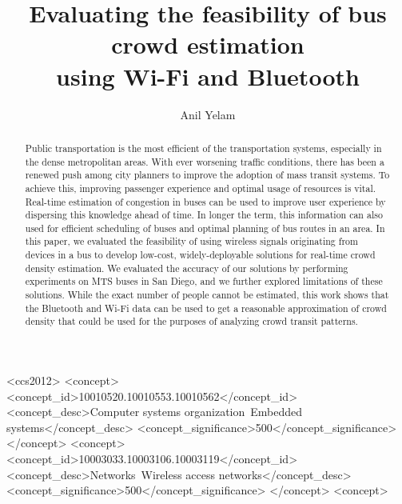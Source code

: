\documentclass[sigconf,nonacm]{acmart}
\begin{document}
\title{Evaluating the feasibility of bus crowd estimation\\ using Wi-Fi and Bluetooth}


\author{Anil Yelam}



\begin{abstract}
Public transportation is the most efficient of the 
transportation systems, especially in the dense 
metropolitan areas. With ever worsening traffic 
conditions, there has been a renewed push among city 
planners to improve the adoption of mass transit systems. 
To achieve this, improving passenger experience and optimal 
usage of resources is vital. Real-time estimation of 
congestion in buses can be used to improve user experience 
by dispersing this knowledge ahead of time. In longer the 
term, this information can also used for efficient 
scheduling of buses and optimal planning of bus routes 
in an area. In this paper, we evaluated the feasibility of 
using wireless signals originating from devices in a bus 
to develop low-cost, widely-deployable solutions for 
real-time crowd density estimation. We evaluated the 
accuracy of our solutions by performing experiments 
on MTS buses in San Diego, and we further explored 
limitations of these solutions. While the exact number 
of people cannot be estimated, this work shows that the 
Bluetooth and Wi-Fi data can be used to get a reasonable 
approximation of crowd density that could be used for the 
purposes of analyzing crowd transit patterns.
\end{abstract}

%
%
\begin{CCSXML}
<ccs2012>
 <concept>
  <concept_id>10010520.10010553.10010562</concept_id>
  <concept_desc>Computer systems organization~Embedded systems</concept_desc>
  <concept_significance>500</concept_significance>
 </concept>
 <concept>
  <concept_id>10003033.10003106.10003119</concept_id>
  <concept_desc>Networks~Wireless access networks</concept_desc>
  <concept_significance>500</concept_significance>
  </concept>
 <concept>
\end{CCSXML}




\maketitle





\end{document}
